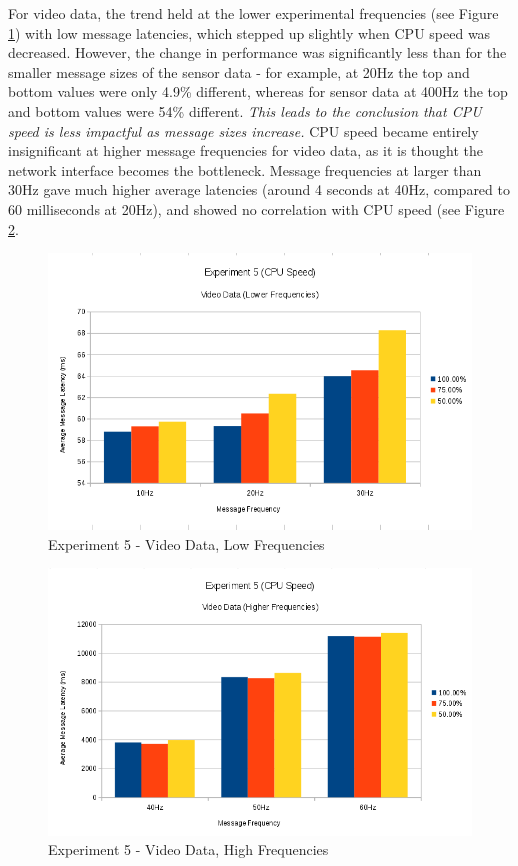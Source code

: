 \documentclass[../dissertation.tex]{subfiles}
\begin{document}
For video data, the trend held at the lower experimental frequencies (see Figure \ref{exp5-video-means-low-freq}) with low message latencies, which stepped up slightly when CPU speed was decreased. However, the change in performance was significantly less than for the smaller message sizes of the sensor data - for example, at 20Hz the top and bottom values were only 4.9\% different, whereas for sensor data at 400Hz the top and bottom values were 54\% different. \textit{This leads to the conclusion that CPU speed is less impactful as message sizes increase.} CPU speed became entirely insignificant at higher message frequencies for video data, as it is thought the network interface becomes the bottleneck. Message frequencies at larger than 30Hz gave much higher average latencies (around 4 seconds at 40Hz, compared to 60 milliseconds at 20Hz), and showed no correlation with CPU speed (see Figure \ref{exp5-video-means-high-freq}.

\begin{figure}[H]
\centering
\includegraphics[width=\textwidth]{images/experiment5/video_data_low_freqs.png}
\caption{Experiment 5 - Video Data, Low Frequencies}
\label{exp5-video-means-low-freq}
\end{figure}

\begin{figure}[H]
\centering
\includegraphics[width=\textwidth]{images/experiment5/video_data_higher_freqs.png}
\caption{Experiment 5 - Video Data, High Frequencies}
\label{exp5-video-means-high-freq}
\end{figure}
\end{document}
